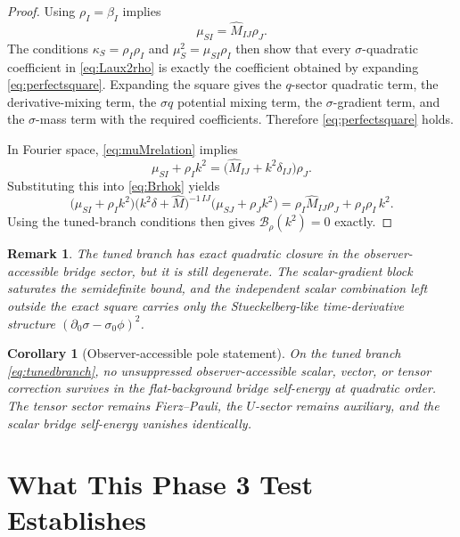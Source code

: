 \documentclass[11pt]{article}
\newtheorem{remark}{Remark}
\newtheorem{corollary}{Corollary}
\begin{document}
\begin{proof}
Using \(\rho_I=\beta_I\) implies
\begin{equation}
\mu_{SI}=\widehat M_{IJ}\rho_J.
\label{eq:muMrelation}
\end{equation}
The conditions \(\kappa_S=\rho_I\rho_I\) and \(\mu_S^2=\mu_{SI}\rho_I\) then show that every \(\sigma\)-quadratic coefficient in \eqref{eq:Laux2rho} is exactly the coefficient obtained by expanding \eqref{eq:perfectsquare}. Expanding the square gives the \(q\)-sector quadratic term, the derivative-mixing term, the \(\sigma q\) potential mixing term, the \(\sigma\)-gradient term, and the \(\sigma\)-mass term with the required coefficients. Therefore \eqref{eq:perfectsquare} holds.

In Fourier space, \eqref{eq:muMrelation} implies
\[
\mu_{SI}+\rho_Ik^2
=
\bigl(\widehat M_{IJ}+k^2\delta_{IJ}\bigr)\rho_J.
\]
Substituting this into \eqref{eq:Brhok} yields
\[
\bigl(\mu_{SI}+\rho_Ik^2\bigr)
\bigl(k^2\delta+\widehat M\bigr)^{-1\,IJ}
\bigl(\mu_{SJ}+\rho_Jk^2\bigr)
=
\rho_I\widehat M_{IJ}\rho_J+\rho_I\rho_I\,k^2.
\]
Using the tuned-branch conditions then gives \(\mathcal B_{\rho}(k^2)=0\) exactly.
\end{proof}

\begin{remark}
The tuned branch has exact quadratic closure in the observer-accessible bridge sector, but it is still degenerate. The scalar-gradient block saturates the semidefinite bound, and the independent scalar combination left outside the exact square carries only the Stueckelberg-like time-derivative structure \((\partial_0\sigma-\sigma_0\phi)^2\).
\end{remark}

\begin{corollary}[Observer-accessible pole statement]
On the tuned branch \eqref{eq:tunedbranch}, no unsuppressed observer-accessible scalar, vector, or tensor correction survives in the flat-background bridge self-energy at quadratic order. The tensor sector remains Fierz--Pauli, the \(U\)-sector remains auxiliary, and the scalar bridge self-energy vanishes identically.
\end{corollary}

\section{What This Phase 3 Test Establishes}
\end{document}
